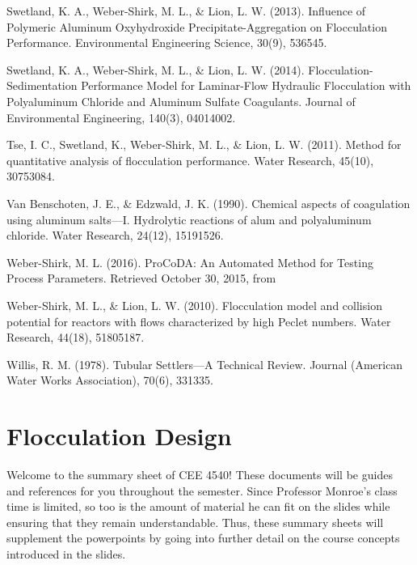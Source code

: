 \documentclass[letterpaper,10pt,english]{sphinxmanual}
\begin{document}
Swetland, K. A., Weber-Shirk, M. L., \& Lion, L. W. (2013). Influence of Polymeric Aluminum Oxyhydroxide Precipitate-Aggregation on Flocculation Performance. Environmental Engineering Science, 30(9), 536\textendash{}545. 

Swetland, K. A., Weber-Shirk, M. L., \& Lion, L. W. (2014). Flocculation-Sedimentation Performance Model for Laminar-Flow Hydraulic Flocculation with Polyaluminum Chloride and Aluminum Sulfate Coagulants. Journal of Environmental Engineering, 140(3), 04014002. 

Tse, I. C., Swetland, K., Weber-Shirk, M. L., \& Lion, L. W. (2011). Method for quantitative analysis of flocculation performance. Water Research, 45(10), 3075\textendash{}3084. 

Van Benschoten, J. E., \& Edzwald, J. K. (1990). Chemical aspects of coagulation using aluminum salts—I. Hydrolytic reactions of alum and polyaluminum chloride. Water Research, 24(12), 1519\textendash{}1526. 

Weber-Shirk, M. L. (2016). ProCoDA: An Automated Method for Testing Process Parameters. Retrieved October 30, 2015, from 

Weber-Shirk, M. L., \& Lion, L. W. (2010). Flocculation model and collision potential for reactors with flows characterized by high Peclet numbers. Water Research, 44(18), 5180\textendash{}5187. 

Willis, R. M. (1978). Tubular Settlers—A Technical Review. Journal (American Water Works Association), 70(6), 331\textendash{}335.




\chapter{Flocculation Design}
\label{\detokenize{Flocculation/Floc_Design:flocculation-design}}\label{\detokenize{Flocculation/Floc_Design:title-flocculation-design}}\label{\detokenize{Flocculation/Floc_Design::doc}}
Welcome to the  summary sheet of CEE 4540! These documents will be guides and references for you throughout the semester. Since
Professor Monroe’s class time is limited, so too is the amount of material he can fit on the slides while ensuring that they remain
understandable. Thus, these summary sheets will supplement the powerpoints by going into further detail on the course concepts
introduced in the slides.
\end{document}
